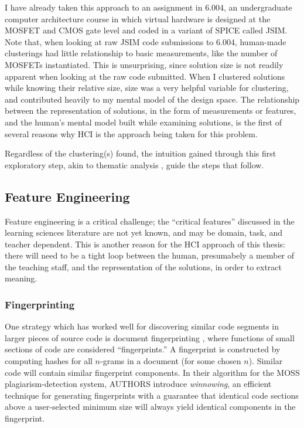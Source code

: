 \documentclass[12pt]{article}
\begin{document}
I have already taken this approach to an assignment in 6.004, an undergraduate computer architecture course in which virtual hardware is designed at the MOSFET and CMOS gate level and coded in a variant of SPICE called JSIM. Note that, when looking at raw JSIM code submissions to 6.004, human-made clusterings had little relationship to basic measurements, like the number of MOSFETs instantiated. This is unsurprising, since solution size is not readily apparent when looking at the raw code submitted. When I clustered solutions while knowing their relative size, size was a very helpful variable for clustering, and contributed heavily to my mental model of the design space. The relationship between the representation of solutions, in the form of measurements or features, and the human's mental model built while examining solutions, is the first of several reasons why HCI is the approach being taken for this problem.

Regardless of the clustering(s) found, the intuition gained through this first exploratory step, akin to thematic analysis \cite{thematic06}, guide the steps that follow.

\subsection{Feature Engineering}

Feature engineering is a critical challenge; the ``critical features'' discussed in the learning sciences literature are not yet known, and may be domain, task, and teacher dependent. This is another reason for the HCI approach of this thesis: there will need to be a tight loop between the human, presumabely a member of the teaching staff, and the representation of the solutions, in order to extract meaning.

\subsubsection{Fingerprinting}

One strategy which has worked well for discovering similar code segments in larger pieces of source code is document fingerprinting \cite{MossFolks}, where functions of small sections of code are considered ``fingerprints.'' A fingerprint is constructed by computing hashes for all $n$-grams in a document (for some chosen $n$). Similar code will contain similar fingerprint components. In their algorithm for the MOSS plagiarism-detection system, AUTHORS \cite{MossFolks} introduce \emph{winnowing}, an efficient technique for generating fingerprints with a guarantee that identical code sections above a user-selected minimum size will always yield identical components in the fingerprint.
\end{document}
